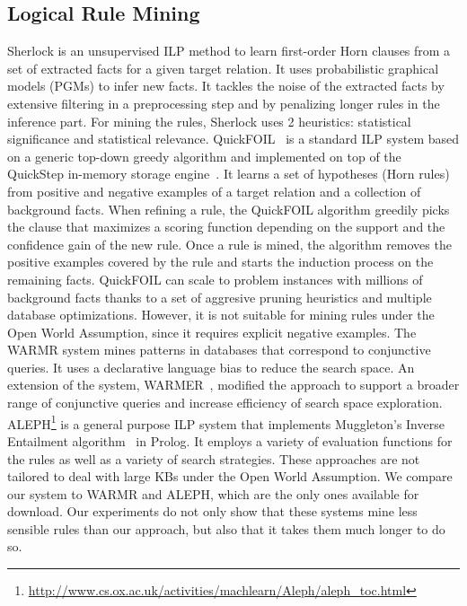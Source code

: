 \subsection{Logical Rule Mining}
Sherlock \cite{SchEtzWel10} is an unsupervised ILP method to learn first-order Horn clauses from a set of extracted facts for a given target relation. 
It uses probabilistic graphical models (PGMs) to infer new facts. 
It tackles the noise of the extracted  facts by extensive filtering in a preprocessing step and by penalizing longer rules in the inference part. 
For mining the rules, Sherlock uses 2 heuristics: statistical significance and statistical relevance.
QuickFOIL~\cite{quickfoil} is a standard ILP system based on a generic top-down greedy algorithm and implemented 
on top of  the QuickStep in-memory storage engine~\cite{Chasseur:2013:DES:2536258.2536260}. It learns a set of hypotheses (Horn rules)
from positive and negative examples of a target relation and a collection of background facts. When refining a rule, the QuickFOIL algorithm 
greedily picks the clause that maximizes a scoring 
function depending on the support and the confidence gain of the new rule. Once a rule is mined, the algorithm removes the positive examples
covered by the rule and starts the induction process on the remaining facts.
QuickFOIL can scale to problem  instances with millions of background facts thanks to a 
set of aggresive pruning heuristics and multiple database optimizations. 
However, it is not suitable for mining rules under the Open World Assumption, since it requires explicit negative examples. 
The WARMR system \cite{DehToi99,DehToi00} mines patterns in data\-bases that correspond to conjunctive queries. It uses a declarative language bias to reduce the search space. 
An extension of the system, WARMER~\cite{GoeVan02}, modified the approach to support a broader range of conjunctive queries and increase efficiency of search space exploration. 
ALEPH\footnote{\label{foot:aleph}\url{http://www.cs.ox.ac.uk/activities/machlearn/Aleph/aleph_toc.html}} is a general purpose ILP system that implements Muggleton's Inverse Entailment algorithm~\cite{Muggleton95inverseentailment} in Prolog. 
It employs a variety of evaluation functions for the rules as well as a variety of search strategies. 
These approaches are not tailored to deal with large KBs under the Open World Assumption. 
We compare our system to WARMR and ALEPH, which are the only ones available for download. 
Our experiments do not only show that these systems mine less sensible rules than our approach, but also that it takes them much longer to do so. 

